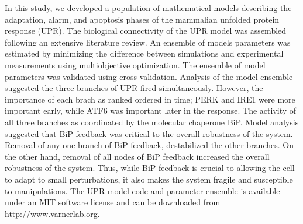 \documentclass[fleqn,10pt]{wlscirep}
\begin{document}
In this study, we developed a population of mathematical models describing the adaptation, alarm, and apoptosis phases of the mammalian unfolded protein response (UPR).
The biological connectivity of the UPR model was assembled following an extensive literature review.
An ensemble of models parameters was estimated by minimizing the difference between simulations and experimental measurements using multiobjective optimization.
The ensemble of model parameters was validated using cross-validation.
Analysis of the model ensemble suggested the three branches of UPR fired simultaneously.
However, the importance of each brach as ranked ordered in time; PERK and IRE1 were more important early, while ATF6 was important later in the response.
The activity of all three branches as coordinated by the molecular chaperone BiP.
Model analysis suggested that BiP feedback was critical to the overall robustness of the system.
Removal of any one branch of BiP feedback, destabilized the other branches.
On the other hand, removal of all nodes of BiP feedback increased the overall robustness of the system.
Thus, while BiP feedback is crucial to allowing the cell to adapt to small perturbations, it also makes the system fragile and susceptible to manipulations.
The UPR model code and parameter ensemble is available under an MIT software license and can be downloaded from http://www.varnerlab.org.
\end{document}
